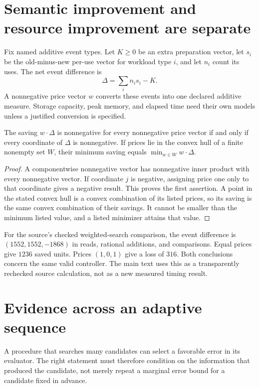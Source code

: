 \section{Semantic improvement and resource improvement are separate}
Fix named additive event types. Let $K\ge0$ be an extra preparation vector, let $s_i$ be the old-minus-new per-use vector for workload type $i$, and let $n_i$ count its uses. The net event difference is
\[
\Delta=\sum_i n_i s_i-K.
\]
A nonnegative price vector $w$ converts these events into one declared additive measure. Storage capacity, peak memory, and elapsed time need their own models unless a justified conversion is specified.

\begin{proposition}\label{r:prices}
The saving $w\cdot\Delta$ is nonnegative for every nonnegative price vector if and only if every coordinate of $\Delta$ is nonnegative. If prices lie in the convex hull of a finite nonempty set $W$, their minimum saving equals $\min_{w\in W}w\cdot\Delta$.
\end{proposition}
\begin{proof}
A componentwise nonnegative vector has nonnegative inner product with every nonnegative vector. If coordinate $j$ is negative, assigning price one only to that coordinate gives a negative result. This proves the first assertion. A point in the stated convex hull is a convex combination of its listed prices, so its saving is the same convex combination of their savings. It cannot be smaller than the minimum listed value, and a listed minimizer attains that value.
\end{proof}

For the source's checked weighted-search comparison, the event difference is $(1552,1552,-1868)$ in reads, rational additions, and comparisons. Equal prices give $1236$ saved units. Prices $(1,0,1)$ give a loss of $316$. Both conclusions concern the same valid controller. The main text uses this as a transparently rechecked source calculation, not as a new measured timing result.

\section{Evidence across an adaptive sequence}
A procedure that searches many candidates can select a favorable error in its evaluator. The right statement must therefore condition on the information that produced the candidate, not merely repeat a marginal error bound for a candidate fixed in advance.

